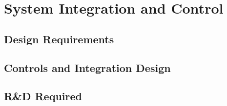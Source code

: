 \section{System Integration and Control}

\subsection{Design Requirements}

\subsection{Controls and Integration Design}

\subsection{R\&D Required}

\blankline
\blankline
